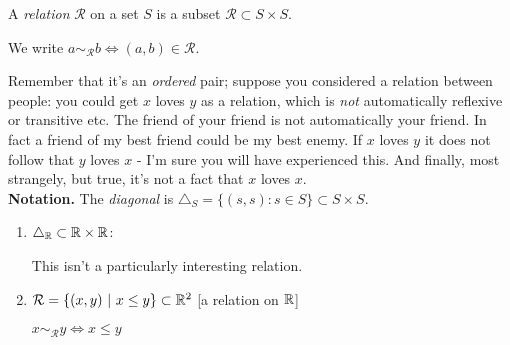 \documentclass[twoside]{scrartcl}
\newcommand{\rel}{\mathcal{R}}
\begin{document}
\begin{definition}
A \emph{relation} $\mathcal{R}$ on a set $S$ is a subset $\mathcal{R} \subset S \times S$. 

We write $a \sim_{\mathcal{R}} b \iff (a,b) \in \mathcal{R}$. 
\end{definition}

Remember that it's an \emph{ordered} pair; suppose you considered a relation between people: you could get $x$ loves $y$ as a relation, which is \emph{not} automatically reflexive or transitive etc. The friend of your friend is not automatically your friend. In fact a friend of my best friend could be my best enemy. If $x$ loves $y$ it does not follow that $y$ loves $x$ - I'm sure you will have experienced this. And finally, most strangely, but true, it's not a fact that $x$ loves $x$.\\

\textbf{Notation.} The \emph{diagonal} is $\triangle_S = \{(s,s): s \in S\} \subset S \times S$.\\

	\begin{examples}
	\begin{enumerate}
	\item  $\triangle_{\mathbb{R}} \subset \mathbb{R} \times \mathbb{R}$:
	\begin{center}
	
	\end{center}
	
	This isn't a particularly interesting relation.
	\item 
	
	$\rel = \{(x,y) ~|~ x \leq y\} \subset \R^2$ [a relation on $\mathbb{R}$]
	\begin{center}
	\end{center}
	
	$x \sim_\rel y \iff x \leq y$
	
		\end{enumerate}
	\end{examples}
	
\end{document}
